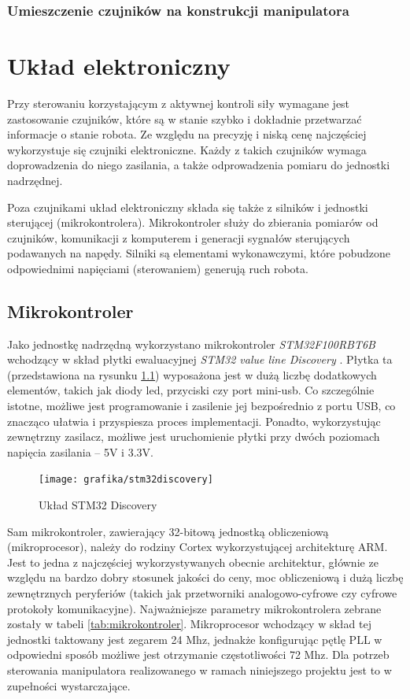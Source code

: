 \documentclass[printmode]{mgr}
\begin{document}
\subsection{Umieszczenie czujników na konstrukcji manipulatora}

\chapter{Układ elektroniczny}
Przy sterowaniu korzystającym z aktywnej kontroli siły wymagane jest zastosowanie czujników, które są w stanie
szybko i dokładnie przetwarzać informacje o stanie robota. Ze względu na precyzję i niską cenę najczęściej wykorzystuje
się czujniki elektroniczne. Każdy z takich czujników wymaga doprowadzenia do niego zasilania, a także
odprowadzenia pomiaru do jednostki nadrzędnej.

Poza czujnikami układ elektroniczny składa się także z silników i jednostki sterującej (mikrokontrolera).
Mikrokontroler służy do zbierania pomiarów od czujników, komunikacji z komputerem i generacji sygnałów sterujących podawanych na napędy.
Silniki są elementami wykonawczymi, które pobudzone odpowiednimi napięciami (sterowaniem) generują ruch robota.

\section{Mikrokontroler}\label{sec:mikrokontroler}
Jako jednostkę nadrzędną wykorzystano mikrokontroler \emph{STM32F100RBT6B} \cite{stm32f100} wchodzący w skład
płytki ewaluacyjnej \emph{STM32 value line Discovery} \cite{stmdiscovery}.
Płytka ta (przedstawiona na rysunku \ref{rys:stm32discovery}) wyposażona jest w dużą liczbę dodatkowych elementów,
takich jak diody led, przyciski czy port mini-usb. Co szczególnie istotne, możliwe jest programowanie i zasilenie jej bezpośrednio z portu 
USB, co znacząco ułatwia i przyspiesza proces implementacji. Ponadto, wykorzystując zewnętrzny zasilacz, możliwe jest
uruchomienie płytki przy dwóch poziomach napięcia zasilania -- 5V i 3.3V.

\begin{figure}[tp]
\centering
  \texttt{[image: grafika/stm32discovery]}
  \caption{Układ STM32 Discovery}
  \label{rys:stm32discovery}  
\end{figure}

Sam mikrokontroler, zawierający 32-bitową jednostką obliczeniową (mikroprocesor), należy do rodziny Cortex wykorzystującej architekturę ARM.
Jest to jedna z najczęściej wykorzystywanych obecnie architektur, głównie ze względu na bardzo dobry stosunek jakości do ceny, moc
obliczeniową i dużą liczbę zewnętrznych peryferiów (takich jak przetworniki analogowo-cyfrowe czy cyfrowe protokoły komunikacyjne).
Najważniejsze parametry mikrokontrolera zebrane zostały w tabeli \ref{tab:mikrokontroler}. Mikroprocesor wchodzący w skład tej jednostki
taktowany jest zegarem 24 Mhz, jednakże konfigurując pętlę PLL w odpowiedni sposób możliwe jest otrzymanie częstotliwości 72 Mhz. 
Dla potrzeb sterowania manipulatora realizowanego w ramach niniejszego projektu jest to w zupełności wystarczające. 
\end{document}
